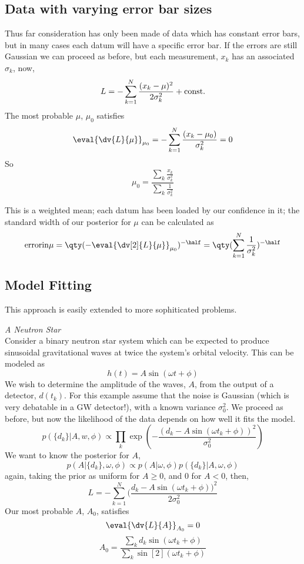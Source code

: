 \documentclass{dwnotes}         		        %
\begin{document}
\subsection{Data with varying error bar sizes}
\label{sec:data-with-varying}

Thus far consideration has only been made of data which has constant
error bars, but in many cases each datum will have a specific error
bar. If the errors are still Gaussian we can proceed as before, but
each measurement, $x_k$ has an associated $\sigma_k$, now,
\[ L = - \sum_{k=1}^N \frac{(x_k - \mu)^2}{2 \sigma_k^2} + {\rm const.}\]
The most probable $\mu$, $\mu_0$ satisfies
\[ \eval{\dv{L}{\mu}}_{\mu_0} = - \sum_{k=1}^N \frac{(x_k -
  \mu_0)}{\sigma_k^2} = 0 \]
So
\[ \mu_0 = \frac{\sum_k \frac{x_k}{\sigma_k^2}}{ \sum_k \frac{1}{\sigma_k^2}} \]

This is a weighted mean; each datum has been loaded by our confidence
in it; the standard width of our posterior for $\mu$ can be calculated
as
\[ {\rm error in } \mu = \qty( - \eval{\dv[2]{L}{\mu}}_{\mu_0} )^{-
  \half} = \qty( \sum_{k=1}^N \frac{1}{\sigma_k^2} )^{- \half} \]

\subsection{Model Fitting}
\label{sec:model-fitting}

This approach is easily extended to more sophiticated problems.
\begin{example} {\em A Neutron Star}\\
  Consider a binary neutron star system which can be expected to
  produce sinusoidal gravitational waves at twice the system's orbital
  velocity. This can be modeled as
  \[ h(t) = A \sin(\omega t + \phi) \] We wish to determine the
  amplitude of the waves, $A$, from the output of a detector,
  $d(t_k)$. For this example assume that the noise is Gaussian (which
  is very debatable in a GW detector!), with a known variance
  $\sigma_0^2$. We proceed as before, but now the likelihood of the
  data depends on how well it fits the model.
  \[ p(\{ d_k \} | A, w, \phi) \propto \prod_k \exp( - \frac{(d_k - A
    \sin(\omega t_k + \phi))^2 }{\sigma_0^2} ) \]
We want to know the posterior for $A$,
\[ p(A | \{ d_k \}, \omega, \phi) \propto p(A | \omega, \phi) p(\{ d_k
\} | A, \omega, \phi) \] again, taking the prior as uniform for $A \ge
0$, and $0$ for $A < 0$, then,
\[ L = - \sum_{k=1}^N (\frac{d_k - A \sin(\omega t_k + \phi) )^2}{2 \sigma_0^2} \]
Our most probable $A$, $A_0$, satisfies
\[ \eval{\dv{L}{A}}_{A_0} = 0 \]
\[ A_0 = \frac{\sum_k d_k \sin(\omega t_k + \phi)}{\sum_k \sin[2](\omega t_k + \phi)} \]
\end{example}
\end{document}
